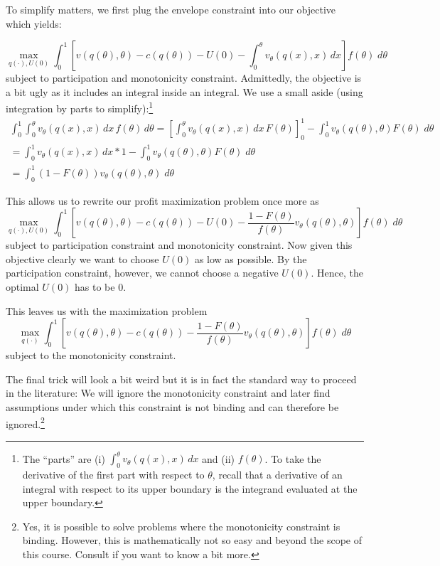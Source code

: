 \documentclass[12pt]{article}
\begin{document}
To simplify matters, we first plug the envelope constraint into our objective which yields:

$$\max_{q(\cdot),U(0)} \int_0^1 [v(q(\theta ),\theta )-c(q(\theta ))-U(0)-\int_0^\theta v_\theta (q(x),x)\,dx]f(\theta )\;d\theta $$
subject to participation and monotonicity constraint. Admittedly, the objective is a bit ugly as it includes an integral inside an integral. We use a small aside (using integration by parts to simplify):\footnote{The ``parts'' are (i) $\int_0^{\theta} v_\theta (q(x),x)\,dx$ and (ii) $f(\theta )$. To take the derivative of the first part with respect to $\theta $, recall that a derivative of an integral with respect to its upper boundary is the integrand evaluated at the upper boundary.}
\begin{multline*}
  \int_0^1\int_0^\theta v_\theta (q(x),x)\,dx\,f(\theta )\,d\theta =\left[\int_0^\theta v_\theta (q(x),x)\,dx\,F(\theta )\right]_0^1-\int_0^1v_\theta (q(\theta ),\theta ) F(\theta )\;d\theta\\
  =\int_0^1 v_\theta (q(x ),x )\,dx*1 -\int_0^1v_\theta (q(\theta ),\theta ) F(\theta )\;d\theta\\
  =\int_0^1(1-F(\theta ))v_\theta (q(\theta ),\theta )\;d\theta 
\end{multline*}

This allows us to rewrite our profit maximization problem once more as 
$$\max_{q(\cdot),U(0)} \int_0^1 [v(q(\theta ),\theta )-c(q(\theta ))-U(0)-\frac{1-F(\theta )}{f(\theta )}v_\theta (q(\theta ),\theta )]f(\theta )\;d\theta $$
subject to participation constraint and monotonicity constraint. Now given this objective clearly we want to choose $U(0)$ as low as possible. By the participation constraint, however, we cannot choose a negative $U(0)$. Hence, the optimal $U(0)$ has to be 0.

This leaves us with the maximization problem
$$\max_{q(\cdot)} \int_0^1 [v(q(\theta ),\theta )-c(q(\theta ))-\frac{1-F(\theta )}{f(\theta )}v_\theta (q(\theta ),\theta )]f(\theta )\;d\theta $$
subject to the monotonicity constraint.

The final trick will look a bit weird but it is in fact the standard way to proceed in the literature: We will ignore the monotonicity constraint and later find assumptions under which this constraint is not binding and can therefore be ignored.\footnote{Yes, it is possible to solve problems where the monotonicity constraint is binding. However, this is mathematically not so easy and beyond the scope of this course. Consult \cite[ch. 2.3.3]{bolton2005contract} if you want to know a bit more.}
\end{document}
